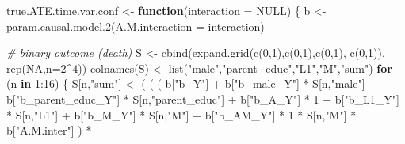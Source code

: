 \documentclass[
]{book}
\newenvironment{Shaded}{\begin{snugshade}}{\end{snugshade}}
\newcommand{\AttributeTok}[1]{\textcolor[rgb]{0.77,0.63,0.00}{#1}}
\newcommand{\CommentTok}[1]{\textcolor[rgb]{0.56,0.35,0.01}{\textit{#1}}}
\newcommand{\ConstantTok}[1]{\textcolor[rgb]{0.00,0.00,0.00}{#1}}
\newcommand{\ControlFlowTok}[1]{\textcolor[rgb]{0.13,0.29,0.53}{\textbf{#1}}}
\newcommand{\DecValTok}[1]{\textcolor[rgb]{0.00,0.00,0.81}{#1}}
\newcommand{\FunctionTok}[1]{\textcolor[rgb]{0.00,0.00,0.00}{#1}}
\newcommand{\NormalTok}[1]{#1}
\newcommand{\OtherTok}[1]{\textcolor[rgb]{0.56,0.35,0.01}{#1}}
\newcommand{\SpecialCharTok}[1]{\textcolor[rgb]{0.00,0.00,0.00}{#1}}
\newcommand{\StringTok}[1]{\textcolor[rgb]{0.31,0.60,0.02}{#1}}
\begin{document}
\begin{Shaded}
\begin{Highlighting}[]
\NormalTok{true.ATE.time.var.conf }\OtherTok{\textless{}{-}} \ControlFlowTok{function}\NormalTok{(}\AttributeTok{interaction =} \ConstantTok{NULL}\NormalTok{) \{}
\NormalTok{  b }\OtherTok{\textless{}{-}} \FunctionTok{param.causal.model.2}\NormalTok{(}\AttributeTok{A.M.interaction =}\NormalTok{ interaction)}
  
  \CommentTok{\# binary outcome (death)}
\NormalTok{  S }\OtherTok{\textless{}{-}} \FunctionTok{cbind}\NormalTok{(}\FunctionTok{expand.grid}\NormalTok{(}\FunctionTok{c}\NormalTok{(}\DecValTok{0}\NormalTok{,}\DecValTok{1}\NormalTok{),}\FunctionTok{c}\NormalTok{(}\DecValTok{0}\NormalTok{,}\DecValTok{1}\NormalTok{),}\FunctionTok{c}\NormalTok{(}\DecValTok{0}\NormalTok{,}\DecValTok{1}\NormalTok{), }\FunctionTok{c}\NormalTok{(}\DecValTok{0}\NormalTok{,}\DecValTok{1}\NormalTok{)), }\FunctionTok{rep}\NormalTok{(}\ConstantTok{NA}\NormalTok{,}\AttributeTok{n=}\DecValTok{2}\SpecialCharTok{\^{}}\DecValTok{4}\NormalTok{))}
  \FunctionTok{colnames}\NormalTok{(S) }\OtherTok{\textless{}{-}} \FunctionTok{list}\NormalTok{(}\StringTok{"male"}\NormalTok{,}\StringTok{"parent\_educ"}\NormalTok{,}\StringTok{"L1"}\NormalTok{,}\StringTok{"M"}\NormalTok{,}\StringTok{"sum"}\NormalTok{)}
  \ControlFlowTok{for}\NormalTok{ (n }\ControlFlowTok{in} \DecValTok{1}\SpecialCharTok{:}\DecValTok{16}\NormalTok{) \{}
\NormalTok{    S[n,}\StringTok{"sum"}\NormalTok{] }\OtherTok{\textless{}{-}}\NormalTok{ ( ( ( b[}\StringTok{"b\_Y"}\NormalTok{] }\SpecialCharTok{+} 
\NormalTok{                      b[}\StringTok{"b\_male\_Y"}\NormalTok{] }\SpecialCharTok{*}\NormalTok{ S[n,}\StringTok{"male"}\NormalTok{] }\SpecialCharTok{+} 
\NormalTok{                      b[}\StringTok{"b\_parent\_educ\_Y"}\NormalTok{] }\SpecialCharTok{*}\NormalTok{ S[n,}\StringTok{"parent\_educ"}\NormalTok{] }\SpecialCharTok{+} 
\NormalTok{                      b[}\StringTok{"b\_A\_Y"}\NormalTok{] }\SpecialCharTok{*} \DecValTok{1} \SpecialCharTok{+} 
\NormalTok{                      b[}\StringTok{"b\_L1\_Y"}\NormalTok{] }\SpecialCharTok{*}\NormalTok{ S[n,}\StringTok{"L1"}\NormalTok{] }\SpecialCharTok{+}
\NormalTok{                      b[}\StringTok{"b\_M\_Y"}\NormalTok{] }\SpecialCharTok{*}\NormalTok{ S[n,}\StringTok{"M"}\NormalTok{] }\SpecialCharTok{+}
\NormalTok{                      b[}\StringTok{"b\_AM\_Y"}\NormalTok{] }\SpecialCharTok{*} \DecValTok{1} \SpecialCharTok{*}\NormalTok{ S[n,}\StringTok{"M"}\NormalTok{] }\SpecialCharTok{*}\NormalTok{ b[}\StringTok{"A.M.inter"}\NormalTok{] ) }\SpecialCharTok{*}

\end{Highlighting}
\end{Shaded}
\end{document}
